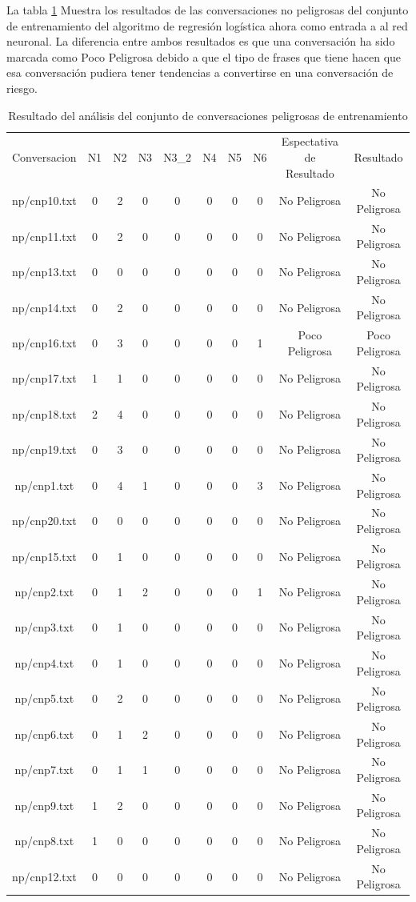 La tabla \ref{tab:tablaresultadosconjuntoentrenamientonopeligroso} Muestra los resultados de las conversaciones no peligrosas del conjunto de entrenamiento del algoritmo de regresi\'on log\'istica ahora como entrada a al red neuronal. La diferencia entre ambos resultados es que una conversaci\'on ha sido marcada como Poco Peligrosa debido a que el tipo de frases que tiene hacen que esa conversaci\'on pudiera tener tendencias a convertirse en una conversaci\'on de riesgo.
\begin{table}[h]
\small
\begin{tabular}{|c|c|c|c|c|c|c|c|c|c|}
\hline
Conversacion & N1 & N2 & N3 & N3\_2 & N4 & N5 & N6 & Espectativa de Resultado & Resultado \\

np/cnp10.txt
& 0
& 2
& 0
& 0
& 0
& 0
& 0
& No Peligrosa
& No Peligrosa \\
np/cnp11.txt
& 0
& 2
& 0
& 0
& 0
& 0
& 0
& No Peligrosa
& No Peligrosa \\
np/cnp13.txt
& 0
& 0
& 0
& 0
& 0
& 0
& 0
& No Peligrosa
& No Peligrosa \\
np/cnp14.txt
& 0
& 2
& 0
& 0
& 0
& 0
& 0
& No Peligrosa
& No Peligrosa \\ 
np/cnp16.txt
& 0
& 3
& 0
& 0
& 0
& 0
& 1
& Poco Peligrosa
& Poco Peligrosa \\
np/cnp17.txt
& 1
& 1
& 0
& 0
& 0
& 0
& 0
& No Peligrosa
& No Peligrosa \\
np/cnp18.txt
& 2
& 4
& 0
& 0
& 0
& 0
& 0
& No Peligrosa
& No Peligrosa\\
np/cnp19.txt
& 0
& 3
& 0
& 0
& 0
& 0
& 0
& No Peligrosa
& No Peligrosa \\
np/cnp1.txt
& 0
& 4
& 1
& 0
& 0
& 0
& 3
& No Peligrosa
& No Peligrosa \\
np/cnp20.txt
& 0
& 0
& 0
& 0
& 0
& 0
& 0
& No Peligrosa
& No Peligrosa \\
np/cnp15.txt
& 0
& 1
& 0
& 0
& 0
& 0
& 0
& No Peligrosa
& No Peligrosa \\
np/cnp2.txt
& 0
& 1
& 2
& 0
& 0
& 0
& 1
& No Peligrosa
& No Peligrosa \\
np/cnp3.txt
& 0
& 1
& 0
& 0
& 0
& 0
& 0
& No Peligrosa
& No Peligrosa \\
np/cnp4.txt
& 0
& 1
& 0
& 0
& 0
& 0
& 0
& No Peligrosa
& No Peligrosa \\
np/cnp5.txt
& 0
& 2
& 0
& 0
& 0
& 0
& 0
& No Peligrosa
& No Peligrosa \\
np/cnp6.txt
& 0
& 1
& 2
& 0
& 0
& 0
& 0
& No Peligrosa
& No Peligrosa \\
np/cnp7.txt
& 0
& 1
& 1
& 0
& 0
& 0
& 0
& No Peligrosa
& No Peligrosa \\
np/cnp9.txt
& 1
& 2
& 0
& 0
& 0
& 0
& 0
& No Peligrosa
& No Peligrosa \\
np/cnp8.txt
& 1
& 0
& 0
& 0
& 0
& 0
& 0
& No Peligrosa
& No Peligrosa \\
np/cnp12.txt
& 0
& 0
& 0
& 0
& 0
& 0
& 0
& No Peligrosa
& No Peligrosa \\
\hline
\end{tabular}
\label{tab:tablaresultadosconjuntoentrenamientonopeligroso}
\caption{Resultado del an\'alisis del conjunto de conversaciones peligrosas de entrenamiento}
\end{table}


